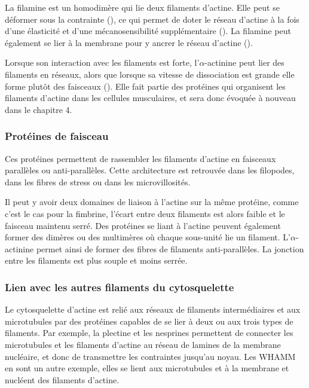 La filamine est un homodimère qui lie deux filaments d'actine. Elle peut se déformer sous la contrainte (\cite{furuike_mechanical_2001}), ce qui permet de doter le réseau d'actine à la fois d'une élasticité et d'une mécanosensibilité supplémentaire (\cite{kainulainen_cell_2002}).
La filamine peut également se lier à la membrane pour y ancrer le réseau d'actine  (\cite{yamazaki_section:_2002}).


Lorsque son interaction avec les filaments est forte, l'$\alpha$-actinine peut lier des filaments en réseaux, alors que lorsque sa vitesse de dissociation est grande elle forme plutôt des faisceaux (\cite{wachsstock_affinity_1993}). Elle fait partie des protéines qui organisent les filaments d'actine dans les cellules musculaires, et sera donc évoquée à nouveau dans le chapitre 4. 


\subsubsection{Protéines de faisceau}

Ces protéines permettent de rassembler les filaments d'actine en faisceaux parallèles ou anti-parallèles. Cette architecture est retrouvée dans les filopodes, dans les fibres de stress ou dans les microvillosités.

Il peut y avoir deux domaines de liaison à l'actine sur la même protéine, comme c'est le cas pour la fimbrine, l'écart entre deux filaments est alors faible et le faisceau maintenu serré. 
Des protéines se liant à l'actine peuvent également former des dimères ou des multimères où chaque sous-unité lie un filament. L'$\alpha$-actinine permet ainsi de former des fibres de filaments anti-parallèles. La jonction entre les filaments est plus souple et moins serrée. 

\subsubsection{Lien avec les autres filaments du cytosquelette}

Le cytosquelette d'actine est relié aux réseaux de filaments intermédiaires et aux microtubules par des protéines capables de se lier à deux ou aux trois types de filaments. 
Par exemple, la plectine et les nesprines permettent de connecter les microtubules et les filaments d'actine au réseau de lamines de la membrane nucléaire, et donc de transmettre les contraintes jusqu'au noyau. 
Les WHAMM en sont un autre exemple, elles se lient aux microtubules et à la membrane et nucléent des filaments d'actine. 


